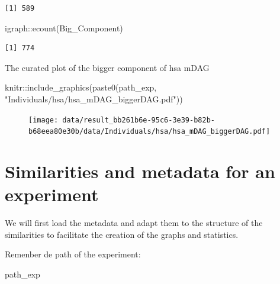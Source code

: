 \documentclass[
  letterpaper,
  DIV=11,
  numbers=noendperiod]{scrreprt}
\newenvironment{Shaded}{}{}
\newcommand{\FunctionTok}[1]{\textcolor[rgb]{0.38,0.69,0.94}{#1}}
\newcommand{\NormalTok}[1]{\textcolor[rgb]{0.67,0.70,0.75}{#1}}
\newcommand{\SpecialCharTok}[1]{\textcolor[rgb]{0.34,0.71,0.76}{#1}}
\newcommand{\StringTok}[1]{\textcolor[rgb]{0.60,0.76,0.47}{#1}}
\begin{document}
\begin{verbatim}
[1] 589
\end{verbatim}

\begin{Shaded}
\begin{Highlighting}[]
\NormalTok{igraph}\SpecialCharTok{::}\FunctionTok{ecount}\NormalTok{(Big\_Component)}
\end{Highlighting}
\end{Shaded}

\begin{verbatim}
[1] 774
\end{verbatim}

The curated plot of the bigger component of hsa mDAG

\begin{Shaded}
\begin{Highlighting}[]
\NormalTok{knitr}\SpecialCharTok{::}\FunctionTok{include\_graphics}\NormalTok{(}\FunctionTok{paste0}\NormalTok{(path\_exp,}
                            \StringTok{"Individuals/hsa/hsa\_mDAG\_biggerDAG.pdf"}\NormalTok{))}
\end{Highlighting}
\end{Shaded}

\begin{figure}[H]

{\centering \texttt{[image: data/result\_bb261b6e-95c6-3e39-b82b-b68eea80e30b/data/Individuals/hsa/hsa\_mDAG\_biggerDAG.pdf]}

}

\end{figure}


\hypertarget{similarities-and-metadata-for-an-experiment}{%
\chapter{Similarities and metadata for an
experiment}\label{similarities-and-metadata-for-an-experiment}}

We will first load the metadata and adapt them to the structure of the
similarities to facilitate the creation of the graphs and statistics.

Remenber de path of the experiment:

\begin{Shaded}
\begin{Highlighting}[]
\NormalTok{path\_exp}
\end{Highlighting}
\end{Shaded}
\end{document}
